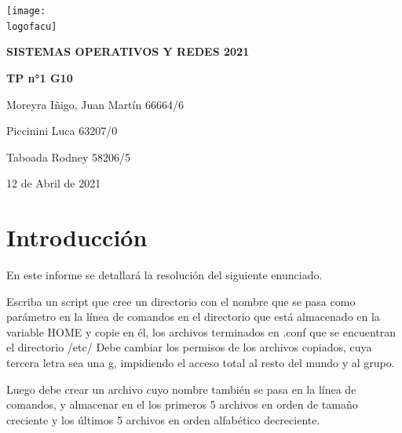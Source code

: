 \documentclass[12pt,a4paper]{article} %
\newcommand{\materia}{SISTEMAS OPERATIVOS Y REDES 2021}
\newcommand{\Date}{12 de Abril de 2021}
\newcommand{\logofacu}{logo-unlp.png}
\begin{document}
	\cfoot{\thepage}
	\begin{titlepage}
	\centering                 
	\texttt{[image: \\logofacu]}\par\vspace{1cm}
	{\scshape\LARGE \textbf{\materia}}\par\vspace{0.2cm}
	{\Huge\bfseries\textcolor{colorfacu}{TP n°1 G10}}\par\vspace{1cm}
	{\large Moreyra Iñigo, Juan Martín
66664/6}\par\vspace{0.2cm}
	{\large Piccinini Luca 63207/0}\par\vspace{0.2cm}
	{\large Taboada Rodney 58206/5}\par\vspace{0.2cm}
	{\large \Date\par}
	\end{titlepage}
	\clearpage
	\tableofcontents
	\clearpage
	\section{Introducción}
	En este informe se detallará la resolución del siguiente enunciado. \par
Escriba un script que cree un directorio con el nombre que se pasa como parámetro en la línea de comandos en el directorio que está almacenado en la variable HOME y copie en él, los archivos terminados en .conf que se encuentran el directorio /etc/
Debe cambiar los permisos de los archivos copiados, cuya tercera letra sea una g, impidiendo el acceso total al resto del mundo y al grupo.\par
Luego debe crear un archivo cuyo nombre también se pasa en la línea de comandos, y almacenar en el los primeros 5 archivos en orden de tamaño creciente y los últimos 5 archivos en orden alfabético decreciente.
\end{document}
